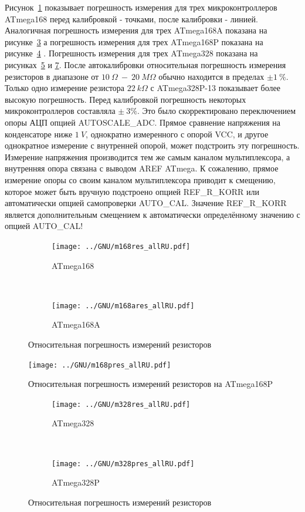 Рисунок~\ref{fig:m168res_all} показывает погрешность измерения для трех микроконтроллеров ATmega168 перед 
калибровкой - точками, после калибровки - линией. Аналогичная погрешность измерения для трех ATmega168A показана 
на рисунке~\ref{fig:m168ares_all} а погрешность измерения для трех ATmega168P показана на 
рисунке~\ref{fig:m168pres_all} .
Погрешность измерения для трех ATmega328 показана на рисунках~\ref{fig:m328res_all} и \ref{fig:m328pres_all}.
После автокалибровки относительная погрешность измерения резисторов в диапазоне от \(10~\Omega~-~20~M\Omega\) 
обычно находится в пределах \(\pm1~\%\). Только одно измерение резистора \(22~k\Omega\) с ATmega328P-13 показывает 
более высокую погрешность. Перед калибровкой погрешность некоторых микроконтроллеров составляла \(\pm~3\%\).
Это было скорректировано переключением опоры АЦП опцией AUTOSCALE\_ADC. Прямое сравнение напряжения на конденсаторе 
ниже \(1~V\), однократно измеренного с опорой VCC, и другое однократное измерение с внутренней опорой, может подстроить 
эту погрешность. Измерение напряжения производится тем же самым каналом мультиплексора, а внутренняя опора связана 
с выводом AREF ATmega. К сожалению, прямое измерение опоры со своим каналом мультиплексора приводит к смещению, 
которое  может быть вручную подстроено опцией  REF\_R\_KORR или автоматически опцией самопроверки AUTO\_CAL. 
Значение REF\_R\_KORR является дополнительным смещением к автоматически определённому значению с опцией AUTO\_CAL!

\begin{figure}[H]
  \begin{subfigure}[b]{.5\textwidth}
    \centering
    \texttt{[image: ../GNU/m168res\_allRU.pdf]}
    \caption{ATmega168}
    \label{fig:m168res_all}
  \end{subfigure}
  ~
  \begin{subfigure}[b]{.5\textwidth}
    \centering
    \texttt{[image: ../GNU/m168ares\_allRU.pdf]}
    \caption{ATmega168A}
    \label{fig:m168ares_all}
  \end{subfigure}
\caption{Относительная погрешность измерений резисторов}
\end{figure}

\begin{figure}[H]
\centering
\texttt{[image: ../GNU/m168pres\_allRU.pdf]}
\caption{Относительная погрешность измерений резисторов на ATmega168P }
\label{fig:m168pres_all}
\end{figure}

\begin{figure}[H]
  \begin{subfigure}[b]{.5\textwidth}
    \centering
    \texttt{[image: ../GNU/m328res\_allRU.pdf]}
    \caption{ATmega328}
    \label{fig:m328res_all}
  \end{subfigure}
  ~
  \begin{subfigure}[b]{.5\textwidth}
    \centering
    \texttt{[image: ../GNU/m328pres\_allRU.pdf]}
    \caption{ATmega328P}
    \label{fig:m328pres_all}
  \end{subfigure}
\caption{Относительная погрешность измерений резисторов}
\end{figure}

